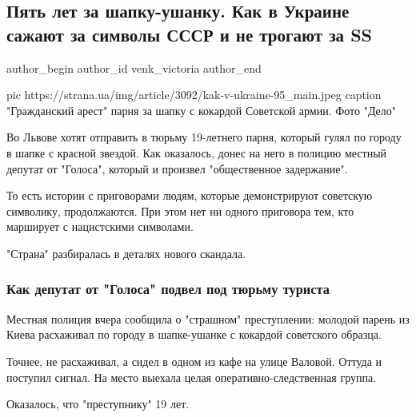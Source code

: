  
 
 
 
 
 
\subsection{Пять лет за шапку-ушанку. Как в Украине сажают за символы СССР и не трогают за SS}
\label{sec:29_12_2020.news.ua.strana.venk_victoria.1.sssr_ss_crime}
\ifcmt
	author_begin
   author_id venk_victoria
	author_end
\fi

\ifcmt
  pic https://strana.ua/img/article/3092/kak-v-ukraine-95_main.jpeg
	caption "Гражданский арест" парня за шапку с кокардой Советской армии. Фото "Дело" 
\fi

Во Львове хотят отправить в тюрьму 19-летнего парня, который гулял по городу в
шапке с красной звездой. Как оказалось, донес на него в полицию местный депутат
от "Голоса", который и произвел "общественное задержание". 

То есть истории с приговорами людям, которые демонстрируют советскую символику,
продолжаются. При этом нет ни одного приговора тем, кто марширует с нацистскими
символами.

"Страна" разбиралась в деталях нового скандала. 

\subsubsection{Как депутат от "Голоса" подвел под тюрьму туриста}

Местная полиция вчера сообщила о "страшном" преступлении: молодой парень из
Киева расхаживал по городу в шапке-ушанке с кокардой советского образца. 

Точнее, не расхаживал, а сидел в одном из кафе на улице Валовой. Оттуда и
поступил сигнал. На место выехала целая оперативно-следственная группа. 

Оказалось, что "преступнику" 19 лет.

